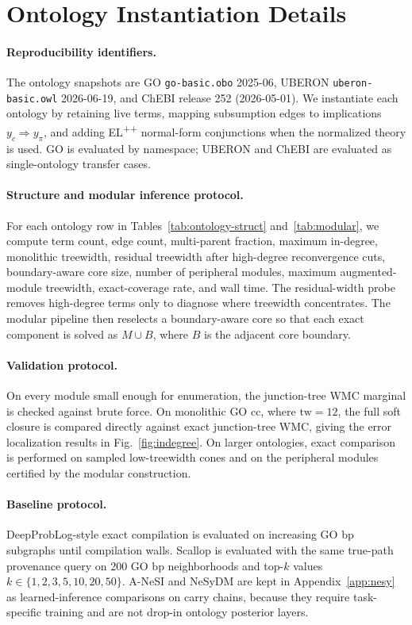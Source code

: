 \documentclass[letterpaper]{article}
\newcommand{\tw}{\ensuremath{\mathrm{tw}}}
\begin{document}
\section{Ontology Instantiation Details}\label{app:multi-ontology}

\paragraph{Reproducibility identifiers.}
The ontology snapshots are GO \citep{geneontology2023} \texttt{go-basic.obo} 2025-06, UBERON \citep{mungall2012uberon} \texttt{uberon-basic.owl} 2026-06-19, and ChEBI \citep{hastings2016chebi} release 252 (2026-05-01). We instantiate each ontology by retaining live terms, mapping subsumption edges to implications $y_c\Rightarrow y_\pi$, and adding EL\textsuperscript{++} normal-form conjunctions when the normalized theory is used. GO is evaluated by namespace; UBERON and ChEBI are evaluated as single-ontology transfer cases.

\paragraph{Structure and modular inference protocol.}
For each ontology row in Tables~\ref{tab:ontology-struct} and~\ref{tab:modular}, we compute term count, edge count, multi-parent fraction, maximum in-degree, monolithic treewidth, residual treewidth after high-degree reconvergence cuts, boundary-aware core size, number of peripheral modules, maximum augmented-module treewidth, exact-coverage rate, and wall time. The residual-width probe removes high-degree terms only to diagnose where treewidth concentrates. The modular pipeline then reselects a boundary-aware core so that each exact component is solved as $M\cup B$, where $B$ is the adjacent core boundary.

\paragraph{Validation protocol.}
On every module small enough for enumeration, the junction-tree WMC marginal is checked against brute force. On monolithic GO cc, where $\tw=12$, the full soft closure is compared directly against exact junction-tree WMC, giving the error localization results in Fig.~\ref{fig:indegree}. On larger ontologies, exact comparison is performed on sampled low-treewidth cones and on the peripheral modules certified by the modular construction.

\paragraph{Baseline protocol.}
DeepProbLog-style exact compilation is evaluated on increasing GO bp subgraphs until compilation walls. Scallop is evaluated with the same true-path provenance query on 200 GO bp neighborhoods and top-$k$ values $k\in\{1,2,3,5,10,20,50\}$. A-NeSI and NeSyDM are kept in Appendix~\ref{app:nesy} as learned-inference comparisons on carry chains, because they require task-specific training and are not drop-in ontology posterior layers.
\end{document}
